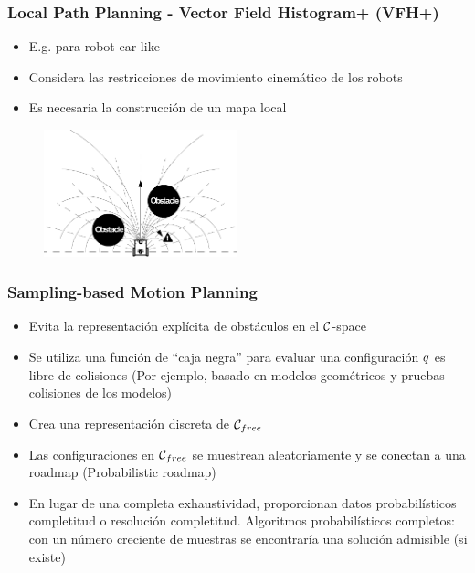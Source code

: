 \begin{frame}
	\frametitle{Local Path Planning - Vector Field Histogram+ (VFH+)}
	
	\begin{itemize}
		\item E.g. para robot car-like
		\item Considera las restricciones de movimiento cinemático de los robots
		\item Es necesaria la construcción de un mapa local
	\end{itemize}
	
	\begin{figure}
		\includegraphics[width=0.5\textwidth]{images/vfh_plus.pdf}
	\end{figure}
	
\end{frame}

\begin{frame}
	\frametitle{Sampling-based Motion Planning}
	
	\begin{itemize}
		\item Evita la representación explícita de obstáculos en el $\mathcal{C}$-space
        \item Se utiliza una función de ``caja negra'' para evaluar una configuración $q$
		es libre de colisiones (Por ejemplo, basado en modelos geométricos y pruebas
		colisiones de los modelos)
		\item Crea una representación discreta de $\mathcal{C}_{free}$
		\item Las configuraciones en $\mathcal{C}_{free}$ se muestrean aleatoriamente y se conectan
		a una roadmap (Probabilistic roadmap)
		\item En lugar de una completa exhaustividad, proporcionan datos probabilísticos completitud o resolución completitud. Algoritmos probabilísticos completos: con un número creciente de muestras se encontraría una solución admisible (si existe)
	\end{itemize}
	
\end{frame}

